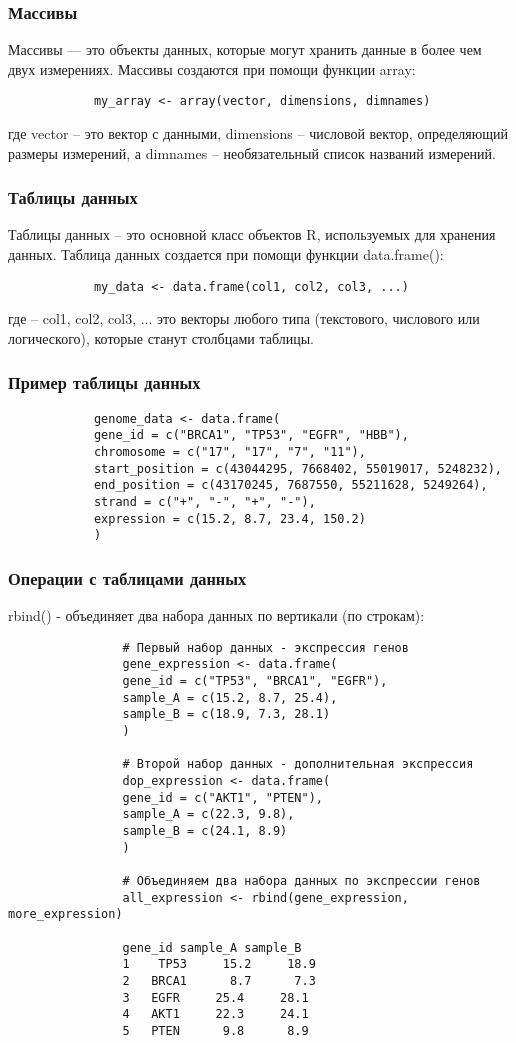 \documentclass[14pt,a4paper]{beamer}
\begin{document}
	\begin{frame}[fragile]
		
		
		\frametitle{Массивы}
		Массивы — это объекты данных, которые могут хранить данные в более чем двух измерениях. Массивы создаются при помощи функции array:
		
		\begin{verbatim}
			my_array <- array(vector, dimensions, dimnames)
		\end{verbatim}
		где vector – это вектор с данными, dimensions – числовой вектор, определяющий размеры измерений, а dimnames – необязательный список названий измерений.	
	\end{frame}
	
	\begin{frame}[fragile]
		\frametitle{Таблицы данных}
		Таблицы данных – это основной класс объектов R, используемых для хранения данных.  Таблица данных создается при помощи функции data.frame():
		\begin{verbatim}
			my_data <- data.frame(col1, col2, col3, ...)
		\end{verbatim}
		где – col1, col2, col3, ... это векторы любого типа (текстового, числового или логического), которые станут столбцами таблицы.	
	\end{frame}
	
	\begin{frame}[fragile]
		
		
		\frametitle{Пример таблицы данных}
		
		\begin{verbatim}
			genome_data <- data.frame(
			gene_id = c("BRCA1", "TP53", "EGFR", "HBB"),
			chromosome = c("17", "17", "7", "11"),
			start_position = c(43044295, 7668402, 55019017, 5248232),
			end_position = c(43170245, 7687550, 55211628, 5249264),
			strand = c("+", "-", "+", "-"),
			expression = c(15.2, 8.7, 23.4, 150.2)
			)
		\end{verbatim}	
	\end{frame}
	
	\begin{frame}[fragile]
		\frametitle{Операции с таблицами данных}
		rbind() - объединяет два набора данных по вертикали (по строкам):
		{\fontsize{7}{8}\selectfont	
			\begin{verbatim}
				# Первый набор данных - экспрессия генов
				gene_expression <- data.frame(
				gene_id = c("TP53", "BRCA1", "EGFR"),
				sample_A = c(15.2, 8.7, 25.4),
				sample_B = c(18.9, 7.3, 28.1)
				)
				
				# Второй набор данных - дополнительная экспрессия
				dop_expression <- data.frame(
				gene_id = c("AKT1", "PTEN"),
				sample_A = c(22.3, 9.8),
				sample_B = c(24.1, 8.9)
				)
				
				# Объединяем два набора данных по экспрессии генов
				all_expression <- rbind(gene_expression, more_expression)
				
				gene_id sample_A sample_B
				1    TP53     15.2     18.9
				2   BRCA1      8.7      7.3
				3   EGFR     25.4     28.1
				4   AKT1     22.3     24.1
				5   PTEN      9.8      8.9		
			\end{verbatim}
		}	
		
	\end{frame}
	
\end{document}
